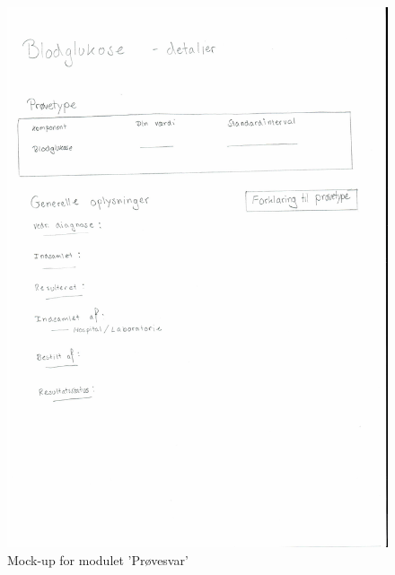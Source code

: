 \begin{figure}[H]
	\centering
	\includegraphics[angle=0, height=0.7\textheight]{Materials/provesvar.pdf}
	\caption{Mock-up for modulet 'Prøvesvar'}
	\label{fig:Mock-Up}
\end{figure}

